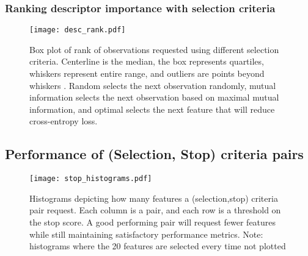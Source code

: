  
 \subsubsection{Ranking descriptor importance with selection criteria}
 \begin{figure}[h]
 	\centering
 	\texttt{[image: desc\_rank.pdf]}
 	\caption[Ranking descriptor importance with selection criteria]{Box plot of rank of observations requested using different selection criteria. Centerline is the median, the box represents quartiles, whiskers represent entire range, and outliers are points beyond whiskers . Random selects the next observation randomly, mutual information selects the next observation based on maximal mutual information, and optimal selects the next feature that will reduce cross-entropy loss.}
 	\label{fig:feedback_mammo_ranks}
 \end{figure}
 

 
 
\subsection{Performance of (Selection, Stop) criteria pairs}


\begin{figure}[h]
	\centering
	\texttt{[image: stop\_histograms.pdf]}
	\caption{Histograms depicting how many features a (selection,stop) criteria pair request. Each column is a pair, and each row is a threshold on the stop score. A good performing pair will request fewer features while still maintaining satisfactory performance metrics. Note: histograms where the 20 features are selected every time not plotted}
	\label{fig:feedback_stop_histograms}
\end{figure}


